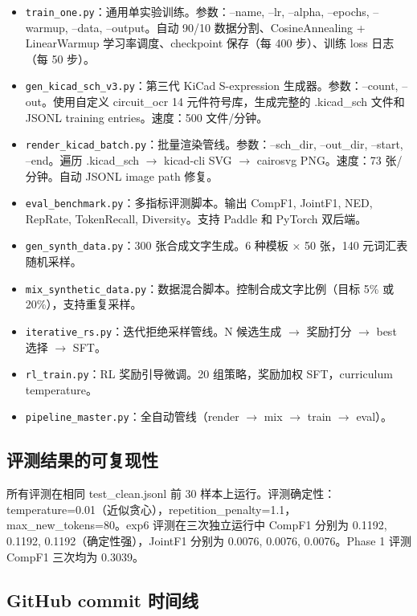 \begin{itemize}[nosep]
    \item \texttt{train\_one.py}：通用单实验训练。参数：--name, --lr, --alpha, --epochs, --warmup, --data, --output。自动 90/10 数据分割、CosineAnnealing + LinearWarmup 学习率调度、checkpoint 保存（每 400 步）、训练 loss 日志（每 50 步）。
    \item \texttt{gen\_kicad\_sch\_v3.py}：第三代 KiCad S-expression 生成器。参数：--count, --out。使用自定义 circuit\_ocr 14 元件符号库，生成完整的 .kicad\_sch 文件和 JSONL training entries。速度：500 文件/分钟。
    \item \texttt{render\_kicad\_batch.py}：批量渲染管线。参数：--sch\_dir, --out\_dir, --start, --end。遍历 .kicad\_sch $\to$ kicad-cli SVG $\to$ cairosvg PNG。速度：73 张/分钟。自动 JSONL image path 修复。
    \item \texttt{eval\_benchmark.py}：多指标评测脚本。输出 CompF1, JointF1, NED, RepRate, TokenRecall, Diversity。支持 Paddle 和 PyTorch 双后端。
    \item \texttt{gen\_synth\_data.py}：300 张合成文字生成。6 种模板 × 50 张，140 元词汇表随机采样。
    \item \texttt{mix\_synthetic\_data.py}：数据混合脚本。控制合成文字比例（目标 5\% 或 20\%），支持重复采样。
    \item \texttt{iterative\_rs.py}：迭代拒绝采样管线。N 候选生成 $\to$ 奖励打分 $\to$ best 选择 $\to$ SFT。
    \item \texttt{rl\_train.py}：RL 奖励引导微调。20 组策略，奖励加权 SFT，curriculum temperature。
    \item \texttt{pipeline\_master.py}：全自动管线（render $\to$ mix $\to$ train $\to$ eval）。
\end{itemize}

\subsection{评测结果的可复现性}

所有评测在相同 test\_clean.jsonl 前 30 样本上运行。评测确定性：temperature=0.01（近似贪心），repetition\_penalty=1.1，max\_new\_tokens=80。exp6 评测在三次独立运行中 CompF1 分别为 0.1192, 0.1192, 0.1192（确定性强），JointF1 分别为 0.0076, 0.0076, 0.0076。Phase 1 评测 CompF1 三次均为 0.3039。

\subsection{GitHub commit 时间线}

